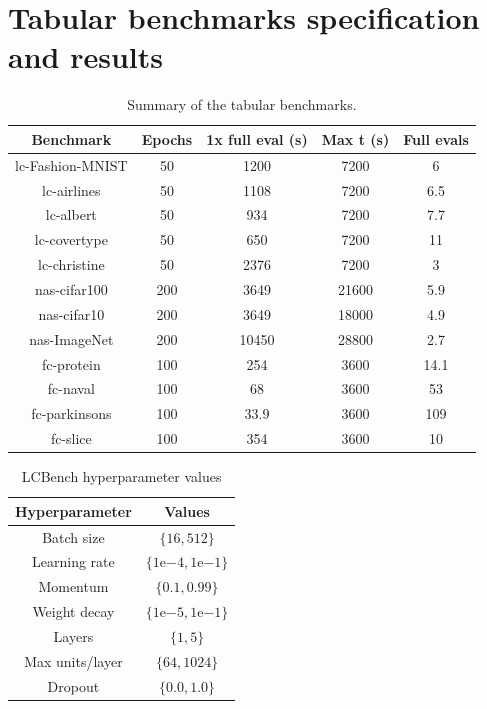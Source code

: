 \chapter{Tabular benchmarks specification and results}
\label{ch:tabular}

\begin{table}[H]
    \centering
\begin{tabular}{ccccc}
    \hline
    \textbf{Benchmark} & \textbf{Epochs} & \textbf{1x full eval (s)} & \textbf{Max t (s)} & \textbf{Full evals} \\ \hline
    lc-Fashion-MNIST & 50 & 1200 & 7200 & 6 \\ \hline
    lc-airlines & 50  & 1108 & 7200  & 6.5 \\ \hline
    lc-albert  & 50  & 934  & 7200 & 7.7 \\ \hline
    lc-covertype  & 50  & 650  & 7200  & 11  \\ \hline
    lc-christine  & 50  & 2376  & 7200  & 3  \\ \hline
    nas-cifar100 & 200 & 3649  & 21600  & 5.9 \\ \hline
    nas-cifar10  & 200 & 3649  & 18000 & 4.9 \\ \hline
    nas-ImageNet & 200 & 10450 & 28800 & 2.7 \\ \hline
    fc-protein & 100 & 254  & 3600  & 14.1 \\ \hline
    fc-naval  & 100  & 68  & 3600  & 53 \\ \hline
    fc-parkinsons  & 100  & 33.9 & 3600  & 109 \\ \hline
    fc-slice  & 100  & 354 & 3600  & 10 \\ \hline
\end{tabular}
\caption{Summary of the tabular benchmarks.}
\end{table}


\begin{table}
    \centering
\begin{tabular}{cc}
    \textbf{Hyperparameter} & \textbf{Values} \\ \midrule
    Batch size & $\{16, 512\}$ \\
    Learning rate & $\{1\mathrm{e}{-4}, 1\mathrm{e}{-1}\}$ \\
    Momentum & $\{0.1, 0.99\}$ \\
    Weight decay & $\{1\mathrm{e}{-5}, 1\mathrm{e}{-1}\}$ \\
    Layers & $\{1, 5\}$ \\
    Max units/layer & $\{64, 1024\}$ \\
    Dropout & $\{0.0, 1.0\}$
    \end{tabular}
    \caption{LCBench hyperparameter values}
    \label{tab:lc}
\end{table}

